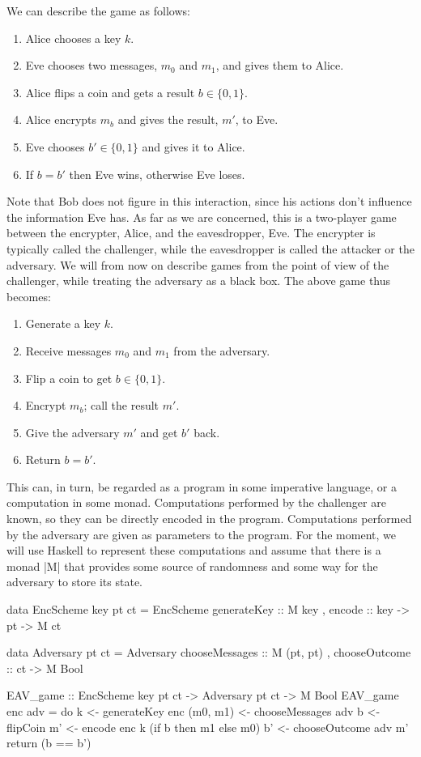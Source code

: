 We can describe the game as follows:
\begin{enumerate}
    \itemsep0em
    \item Alice chooses a key $k$.
    \item Eve chooses two messages, $m_0$ and $m_1$, and gives them to Alice.
    \item Alice flips a coin and gets a result $b \in \{0, 1\}$.
    \item Alice encrypts $m_b$ and gives the result, $m'$, to Eve.
    \item Eve chooses $b' \in \{0, 1\}$ and gives it to Alice.
    \item If $b = b'$ then Eve wins, otherwise Eve loses.
\end{enumerate}

Note that Bob does not figure in this interaction, since his actions don't influence the information Eve has.  As far as
we are concerned, this is a two-player game between the encrypter, Alice, and the eavesdropper, Eve.  The encrypter is
typically called the challenger, while the eavesdropper is called the attacker or the adversary.  We will from now on
describe games from the point of view of the challenger, while treating the adversary as a black box.  The above game
thus becomes:
\begin{enumerate}
    \itemsep0em
    \item Generate a key $k$.
    \item Receive messages $m_0$ and $m_1$ from the adversary.
    \item Flip a coin to get $b \in \{0, 1\}$.
    \item Encrypt $m_b$; call the result $m'$.
    \item Give the adversary $m'$ and get $b'$ back.
    \item Return $b = b'$.
\end{enumerate}

This can, in turn, be regarded as a program in some imperative language, or a computation in some monad.  Computations
performed by the challenger are known, so they can be directly encoded in the program.  Computations performed by the
adversary are given as parameters to the program.  For the moment, we will use Haskell to represent these computations
and assume that there is a monad |M| that provides some source of randomness and some way for the adversary to
store its state.
\begin{code}
data EncScheme key pt ct = EncScheme
                           { generateKey :: M key
                           , encode :: key -> pt -> M ct
                           }

data Adversary pt ct = Adversary
                       { chooseMessages :: M (pt, pt)
                       , chooseOutcome :: ct -> M Bool
                       }

EAV_game :: EncScheme key pt ct -> Adversary pt ct -> M Bool
EAV_game enc adv = do
    k <- generateKey enc
    (m0, m1) <- chooseMessages adv
    b <- flipCoin
    m' <- encode enc k (if b then m1 else m0)
    b' <- chooseOutcome adv m'
    return (b == b')
\end{code}

